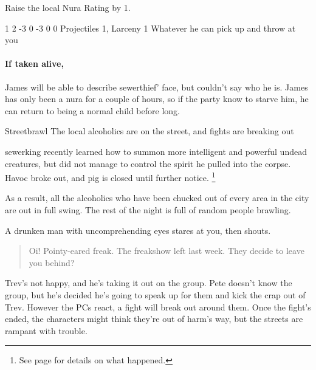 \begin{multicols}{2}
Raise the local Nura Rating by 1.

{1}%
{2}%
{{-3}%
{0}%
{-3}}%
{0}%
{0}%
{Projectiles 1, Larceny 1}%
{Whatever he can pick up and throw at you}%
{}

\paragraph{If taken alive,}
James will be able to describe \gls{sewerthief}' face, but couldn't say who he is.
James has only been a nura for a couple of hours, so if the party know to starve him, he can return to being a normal child before long.

{\N Streetbrawl}%
{The local alcoholics are on the street, and fights are breaking out}%
\label{ghastEscape}

\Gls{sewerking} recently learned how to summon more intelligent and powerful undead creatures, but did not manage to control the spirit he pulled into the corpse.
Havoc broke out, and \gls{pig} is closed until further notice.
\footnote{See page \pageref{pig_pantry} for details on what happened.}

As a result, all the alcoholics who have been chucked out of every area in the city are out in full swing.
The rest of the night is full of random people brawling.

\begin{boxtext}

A drunken man with uncomprehending eyes stares at you, then shouts.

\begin{quotation}

  Oi! Pointy-eared freak.  The freakshow left last week.  They decide to leave you behind?

\end{quotation}

\end{boxtext}

Trev's not happy, and he's taking it out on the group.
Pete doesn't know the group, but he's decided he's going to speak up for them and kick the crap out of Trev.
However the PCs react, a fight will break out around them.
Once the fight's ended, the characters might think they're out of harm's way, but the streets are rampant with trouble.



\end{multicols}
